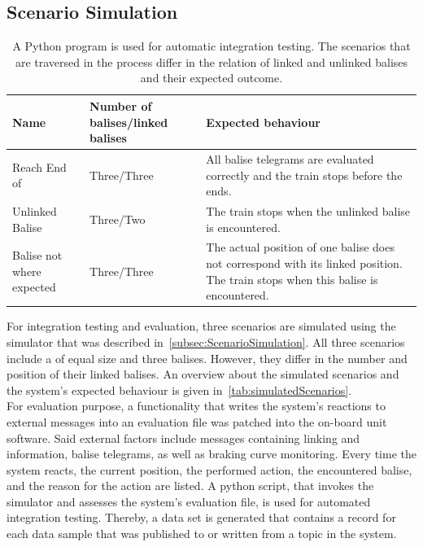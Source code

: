 \subsection{Scenario Simulation}

\begin{table}[h!]
	\begin{center}
		\caption{A Python program is used for automatic integration testing. The scenarios that are traversed in the process differ in the relation of linked and unlinked balises and their expected outcome.}
		\label{tab:simulatedScenarios}
		\begin{tabularx}{\textwidth}{|X|X|X|}
			\hline
			\textbf{Name} & \textbf{Number of balises/linked balises} & \textbf{Expected behaviour}\\
			\hline \hline
			Reach End of \abr{MA} & Three/Three & All balise telegrams are evaluated correctly and the train stops before the \abr{MA} ends. \\
			\hline
			Unlinked Balise & Three/Two & The train stops when the unlinked balise is encountered. \\
			\hline
			Balise not where expected & Three/Three & The actual position of one balise does not correspond with its linked position. The train stops when this balise is encountered. \\
			\hline
		\end{tabularx}
	\end{center}
\end{table}

For integration testing and evaluation, three scenarios are simulated using the simulator that was described in~\autoref{subsec:ScenarioSimulation}.
All three scenarios include a  of equal size and three balises.
However, they differ in the number and position of their linked balises.
An overview about the simulated scenarios and the system's expected behaviour is given in~\autoref{tab:simulatedScenarios}.
\\

For evaluation purpose, a functionality that writes the system's reactions to external messages into an evaluation file was patched into the on-board unit software.
Said external factors include  messages containing linking and  information, balise telegrams, as well as braking curve monitoring.
Every time the system reacts, the current position, the performed action, the encountered balise, and the reason for the action are listed.
A python script, that invokes the simulator and assesses the system's evaluation file, is used for automated integration testing.
Thereby, a data set is generated that contains a record for each data sample that was published to or written from a topic in the system.

